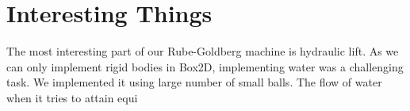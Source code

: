 \documentclass[a4paper,11pt]{article}
\begin{document}
\section{Interesting Things}
{
\indent \indent The most interesting part of our Rube-Goldberg machine is hydraulic lift. As we can only implement rigid bodies in Box2D, implementing water was a challenging task. We implemented it using large number of small balls. 
The flow of water when it tries to attain equi}
\end{document}
